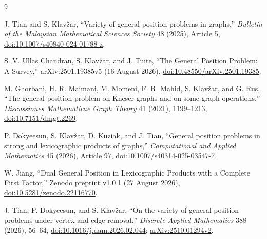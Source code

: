 \documentclass[11pt,a4paper]{article}
\numberwithin{equation}{section}
\begin{document}
\clearpage
\begin{thebibliography}{9}

J. Tian and S. Klav\v{z}ar, ``Variety of general position problems
in graphs,'' \emph{Bulletin of the Malaysian Mathematical Sciences
Society} 48 (2025), Article 5,
\href{https://doi.org/10.1007/s40840-024-01788-z}{doi:10.1007/s40840-024-\mbox{01788-z}}.

S. V. Ullas Chandran, S. Klav\v{z}ar, and J. Tuite, ``The General
Position Problem: A Survey,'' arXiv:2501.19385v5 (16 August 2026),
\href{https://doi.org/10.48550/arXiv.2501.19385}{doi:10.48550/arXiv.2501.19385}.

M. Ghorbani, H. R. Maimani, M. Momeni, F. R. Mahid, S. Klav\v{z}ar,
and G. Rus, ``The general position problem on Kneser graphs and on some
graph operations,'' \emph{Discussiones Mathematicae Graph Theory} 41
(2021), 1199--1213,
\href{https://doi.org/10.7151/dmgt.2269}{doi:10.7151/dmgt.2269}.

P. Dokyeesun, S. Klav\v{z}ar, D. Kuziak, and J. Tian, ``General
position problems in strong and lexicographic products of graphs,''
\emph{Computational and Applied Mathematics} 45 (2026), Article 97,
\href{https://doi.org/10.1007/s40314-025-03547-7}{doi:10.1007/s40314-025-03547-7}.

W. Jiang, ``Dual General Position in Lexicographic Products with
a Complete First Factor,'' Zenodo preprint v1.0.1 (27 August 2026),
\href{https://doi.org/10.5281/zenodo.22116770}{doi:10.5281/zenodo.22116770}.

J. Tian, P. Dokyeesun, and S. Klav\v{z}ar, ``On the variety of
general position problems under vertex and edge removal,''
\emph{Discrete Applied Mathematics} 388 (2026), 56--64,
\href{https://doi.org/10.1016/j.dam.2026.02.044}{doi:10.1016/j.dam.2026.02.044};
\href{https://arxiv.org/abs/2510.01294v2}{arXiv:2510.01294v2}.

\end{thebibliography}
\end{document}

